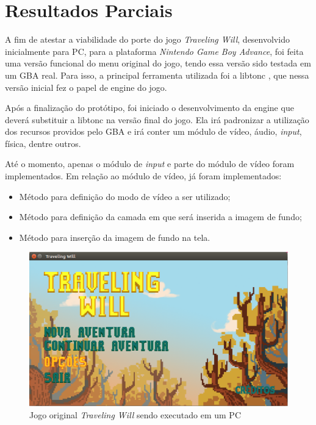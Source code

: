 \chapter[Resultados Parciais]{Resultados Parciais}

A fim de atestar a viabilidade do porte do jogo \textit{Traveling Will}, desenvolvido inicialmente para PC, para a plataforma \textit{Nintendo Game Boy Advance}, foi feita uma versão funcional do menu original do jogo, tendo essa versão sido testada em um GBA real. Para isso, a principal ferramenta utilizada foi a libtonc \cite{libtonc}, que nessa versão inicial fez o papel de engine do jogo.

Após a finalização do protótipo, foi iniciado o desenvolvimento da engine que deverá substituir a libtonc na versão final do jogo. Ela irá padronizar a utilização dos recursos providos pelo GBA e irá conter um módulo de vídeo, áudio, \textit{input}, física, dentre outros.

Até o momento, apenas o módulo de \textit{input} e parte do módulo de vídeo foram implementados. Em relação ao módulo de vídeo, já foram implementados:

\begin{itemize}

\item Método para definição do modo de vídeo a ser utilizado;
\item Método para definição da camada em que será inserida a imagem de fundo;
\item Método para inserção da imagem de fundo na tela.

\end{itemize}

\begin{figure}[H]
 \centering \includegraphics[keepaspectratio=true,scale=0.6]{figuras/tw-original-1.eps}
   \caption{Jogo original \textit{Traveling Will} sendo executado em um PC}
   \label{tw-original-1}
\end{figure}

